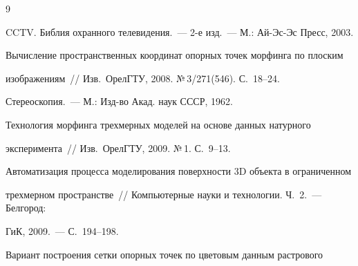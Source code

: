 {\frenchspacing\small




\begin{thebibliography}{9}









CCTV. Библия охранного телевидения.~--- 2-е изд.~--- М.: Ай-Эс-Эс Пресс, 2003. 









Вычисление пространственных координат опорных точек морфинга по плоским 


изоб\-ра\-же\-ни\-ям~// Изв.\ ОрелГТУ, 2008.  №\,3/271(546). С.~18--24.









Стереоскопия.~--- М.: Изд-во Акад. наук СССР, 1962.









Технология морфинга трехмерных моделей на основе данных натурного 


эксперимента~// Изв.\ ОрелГТУ, 2009. №\,1. С.~9--13.









Автоматизация процесса моделирования поверхности 3D объекта в ограниченном 


трехмерном пространстве~// Компьютерные науки и технологии. Ч.~2.~--- Белгород: 


ГиК, 2009.~--- С.~194--198.









Вариант построения сетки опорных точек по цветовым данным растрового 



\end{thebibliography}}
